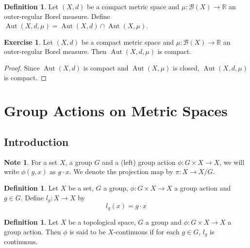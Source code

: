 \documentclass[12pt]{amsart}
\theoremstyle{definition}
\newtheorem{defn}[definition]{Definition}
\newtheorem{note}[definition]{Note}
\newtheorem{ex}[definition]{Exercise}
\newcommand{\R}{\mathbb{R}}
\newcommand{\MB}{\mathcal{B}}
\DeclareMathOperator{\Aut}{Aut}
\newcommand{\lex}[1]{\label{ex:#1}}
\newcommand{\ld}[1]{\label{defn:#1}}
\begin{document}
	\begin{defn} \ld{}
	Let $(X,d)$ be a compact metric space and $\mu: \MB(X) \rightarrow \R$ an outer-regular Borel measure. Define $\Aut(X, d, \mu) = \Aut(X, d) \cap \Aut(X, \mu)$.
	\end{defn}
	
	\begin{ex} \lex{}
	Let $(X,d)$ be a compact metric space and $\mu: \MB(X) \rightarrow \R$ an outer-regular Borel measure. Then $\Aut(X, d, \mu)$ is compact.
	\end{ex}
	
	\begin{proof}
	Since $\Aut(X, d)$ is compact and $\Aut(X, \mu)$ is closed, $\Aut(X, d, \mu)$ is compact.
	\end{proof}
	
	
	
	
	
	
	
	
	
	
	
	
	
	

	
	
	
	
	
	
	
	
	
	
	\newpage
	\section{Group Actions on Metric Spaces}
	
	\subsection{Introduction}
	\begin{note}
	For a set $X$, a group $G$ and a (left) group action $\phi: G \times X \rightarrow X$, we will write $\phi(g, x)$ as $g \cdot x$. We denote the projection map by $\pi: X \rightarrow X/G$.
	\end{note}	
	
	\begin{defn} \ld{00000} 
		Let $X$ be a set, $G$ a group, $\phi: G \times X \rightarrow X$ a group action and $g \in G$. Define $l_g:X \rightarrow X$ by 
		\begin{equation*}
		l_g(x) = g \cdot x
		\end{equation*}
	\end{defn}
	
	\begin{defn}
	Let $X$ be a topological space, $G$ a group and $\phi: G \times X \rightarrow X$ a group action. Then $\phi$ is said to be $X$-continuous if for each $g \in G$, $l_g$ is continuous.
	\end{defn}
	
\end{document}
